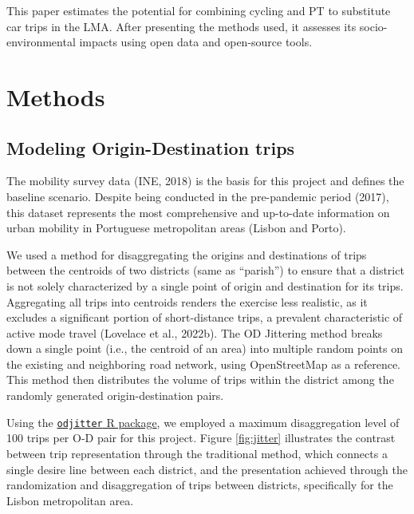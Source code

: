 \documentclass[review, doubleblind, 3p,
authoryear]{elsarticle} %
\begin{document}
This paper estimates the potential for combining cycling and PT to
substitute car trips in the LMA. After presenting the methods used, it
assesses its socio-environmental impacts using open data and open-source
tools.

\hypertarget{methods}{%
\section{Methods}\label{methods}}

\hypertarget{modeling-origin-destination-trips}{%
\subsection{Modeling Origin-Destination
trips}\label{modeling-origin-destination-trips}}

The mobility survey data (INE, 2018) is the basis for this project and
defines the baseline scenario. Despite being conducted in the
pre-pandemic period (2017), this dataset represents the most
comprehensive and up-to-date information on urban mobility in Portuguese
metropolitan areas (Lisbon and Porto).

We used a method for disaggregating the origins and destinations of
trips between the centroids of two districts (same as ``parish'') to
ensure that a district is not solely characterized by a single point of
origin and destination for its trips. Aggregating all trips into
centroids renders the exercise less realistic, as it excludes a
significant portion of short-distance trips, a prevalent characteristic
of active mode travel (Lovelace et al., 2022b). The OD Jittering method
breaks down a single point (i.e., the centroid of an area) into multiple
random points on the existing and neighboring road network, using
OpenStreetMap as a reference. This method then distributes the volume of
trips within the district among the randomly generated
origin-destination pairs.

Using the
\href{https://github.com/dabreegster/odjitter}{\texttt{odjitter} R
package}, we employed a maximum disaggregation level of 100 trips per
O-D pair for this project. Figure \ref{fig:jitter} illustrates the
contrast between trip representation through the traditional method,
which connects a single desire line between each district, and the
presentation achieved through the randomization and disaggregation of
trips between districts, specifically for the Lisbon metropolitan area.
\end{document}
